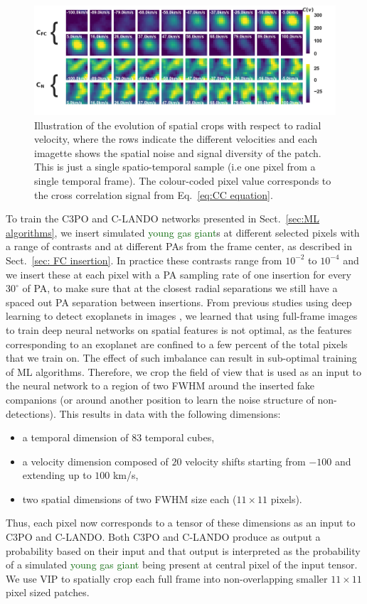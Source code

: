 \documentclass[referee]{aa} %
\newcommand{\newchange}[1]{\textcolor{darkgreen}{#1}}
\begin{document}
\begin{figure}[t]
    \includegraphics[width=\textwidth]{fig_2_dec2023_aligned_cropped.png}
    \caption{
    Illustration of the evolution of spatial crops with respect to radial velocity, where the rows indicate the different velocities and each imagette shows the spatial noise and signal diversity of the patch. 
    This is just a single spatio-temporal sample (i.e one pixel from a single temporal frame).
    The colour-coded pixel value corresponds to the cross correlation signal from Eq.~\ref{eq:CC equation}. 
    }
    \label{fig:fig-2}
\end{figure}

To train the C3PO and C-LANDO networks presented in Sect.~\ref{sec:ML algorithms}, we insert simulated \newchange{young gas giant}s at different selected pixels with a range of contrasts and at different PAs from the frame center, as described in Sect.~\ref{sec: FC insertion}.
In practice these contrasts range from $10^{-2}$ to $10^{-4}$ and we insert these at each pixel with a PA sampling rate of one insertion for every $30^{\circ}$ of PA, to make sure that at the closest radial separations we still have a spaced out PA separation between insertions. 
From previous studies using deep learning to detect exoplanets in images \citep[e.g.,][]{2018Gomez,2023Carlito}, we learned that using full-frame images to train deep neural networks on spatial features is not optimal, as the features corresponding to an exoplanet are confined to a few percent of the total pixels that we train on. 
The effect of such imbalance can result in sub-optimal training of ML algorithms.
Therefore, we crop the field of view that is used as an input to the neural network to a region of two FWHM around the inserted fake companions (or around another position to learn the noise structure of non-detections).
This results in data with the following dimensions:
\begin{itemize}
    \item a temporal dimension of $83$ temporal cubes, 
    \item a velocity dimension composed of $20$ velocity shifts starting from $-100$ and extending up to $100$ km/s, 
    \item two spatial dimensions of two FWHM size each ($11\times 11$ pixels).
\end{itemize}
Thus, each pixel now corresponds to a tensor of these dimensions as an input to C3PO and C-LANDO.
Both C3PO and C-LANDO produce as output a probability based on their input and that output is interpreted as the probability of a simulated \newchange{young gas giant} being present at central pixel of the input tensor.
We use VIP to spatially crop each full frame into non-overlapping smaller $11\times11$ pixel sized patches.
\end{document}
